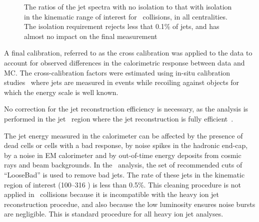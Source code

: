 \begin{figure}
\caption{The ratios of the jet spectra with no isolation to that with isolation in the kinematic range of interest for \pbpb\ collisions, in all centralities.
The isolation requirement rejects less that 0.1\% of jets, and has almost no impact on the final measurement}
\label{fig:ISO}
\end{figure}  



A final calibration, referred to as the cross calibration \cite{cc2015} 
was applied to the data to account for observed differences in the calorimetric response between data and MC.
The cross-calibration factors were estimated using in-situ calibration studies~\cite{HIjesnote} where jets are measured in events while recoiling against objects for which the energy scale is well known.

No correction for the jet reconstruction efficiency is necessary, as the analysis is performed in the jet \pT\ region where the jet reconstruction is fully efficient~\cite{2015392}.


The jet energy measured in the calorimeter can be affected by the presence 
of dead cells or cells with a bad response, by noise spikes in the hadronic end-cap, by a noise in EM calorimeter and by out-of-time energy deposits from cosmic rays and beam backgrounds.
In the \pp\ analysis, the set of recommended cuts of ``LooseBad'' is used to remove bad jets.
The rate of these jets in the kinematic region of interest (100--316 \GeV) is less than 0.5\%.
This cleaning procedure is not applied in \PbPb\ collisions because it is incompatible with the heavy ion jet reconstruction procedue, and also because the low luminosity ensures noise bursts are negligible.
This is standard procedure for all heavy ion jet analyses.
 
